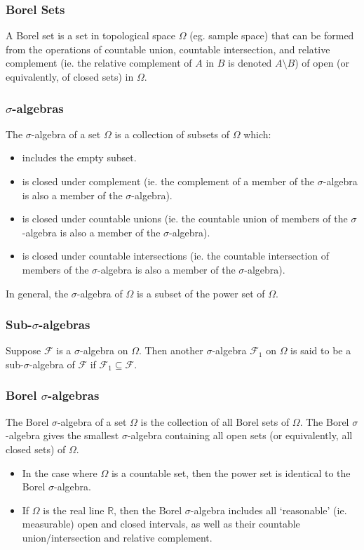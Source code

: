 \documentclass[11pt]{report} %
\begin{document}
\subsubsection{Borel Sets}

A Borel set is a set in topological space $\Omega$ (eg. sample space) that can be formed from the operations of countable union, countable intersection, and relative complement (ie. the relative complement of $A$ in $B$ is denoted $A\setminus B$) of open (or equivalently, of closed sets) in $\Omega$.

\subsubsection{$\sigma$-algebras}

The $\sigma$-algebra of a set $\Omega$ is a collection of subsets of $\Omega$ which:
\begin{itemize}
\item includes the empty subset.
\item is closed under complement (ie. the complement of a member of the $\sigma$-algebra is also a member of the $\sigma$-algebra).
\item is closed under countable unions (ie. the countable union of members of the $\sigma$-algebra is also a member of the $\sigma$-algebra).
\item is closed under countable intersections (ie. the countable intersection of members of the $\sigma$-algebra is also a member of the $\sigma$-algebra).
\end{itemize}
In general, the $\sigma$-algebra of $\Omega$ is a subset of the power set of $\Omega$.

\subsubsection{Sub-$\sigma$-algebras}

Suppose $\mathcal{F}$ is a $\sigma$-algebra on $\Omega$. Then another $\sigma$-algebra $\mathcal{F}_{1}$ on $\Omega$ is said to be a sub-$\sigma$-algebra of $\mathcal{F}$ if $\mathcal{F}_{1} \subseteq \mathcal{F}$.

\subsubsection{Borel $\sigma$-algebras}

The Borel $\sigma$-algebra of a set $\Omega$ is the collection of all Borel sets of $\Omega$. The Borel $\sigma$-algebra gives the smallest $\sigma$-algebra containing all open sets (or equivalently, all closed sets) of $\Omega$.
\begin{itemize}
\item In the case where $\Omega$ is a countable set, then the power set is identical to the Borel $\sigma$-algebra.
\item If $\Omega$ is the real line $\mathbb{R}$, then the Borel $\sigma$-algebra includes all `reasonable' (ie. measurable) open and closed intervals, as well as their countable union/intersection and relative complement. 
\end{itemize}
\end{document}
